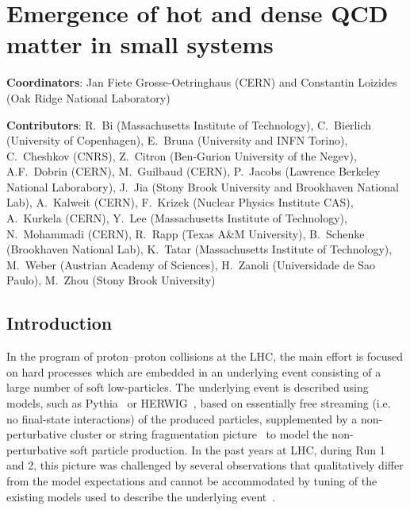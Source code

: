 \documentclass[../report.tex]{subfiles}
\begin{document}
\section{Emergence of hot and dense QCD matter in small systems}
\label{chapter:smallsystems}

{ \small
\noindent \textbf{Coordinators}: Jan Fiete Grosse-Oetringhaus (CERN) and Constantin Loizides (Oak Ridge National Laboratory)

\noindent \textbf{Contributors}:
R.~Bi (Massachusetts Institute of Technology),
C.~Bierlich (University of Copenhagen),
E.~Bruna (University and INFN Torino),
C.~Cheshkov (CNRS),
Z.~Citron (Ben-Gurion University of the Negev),
A.F.~Dobrin (CERN),
M.~Guilbaud (CERN),
P.~Jacobs (Lawrence Berkeley National Laborabory),
J.~Jia (Stony Brook University and Brookhaven National Lab),
A.~Kalweit (CERN),
F.~Krizek (Nuclear Physics Institute CAS),
A.~Kurkela (CERN),
Y.~Lee (Massachusetts Institute of Technology),
N.~Mohammadi (CERN),
R.~Rapp (Texas A\&M University),
B.~Schenke (Brookhaven National Lab),
K.~Tatar (Massachusetts Institute of Technology),
M.~Weber (Austrian Academy of Sciences),
H.~Zanoli (Universidade de Sao Paulo),
M.~Zhou (Stony Brook University)
}

\subsection{Introduction}

In the program of proton--proton collisions at the LHC, the main effort is focused on hard processes which are embedded in an underlying event consisting of a large number of soft low-\pT particles. The underlying event is described using models, such as Pythia~\cite{Sjostrand:2014zea} or HERWIG~\cite{Bellm:2015jjp}, based on essentially free streaming (i.e. no final-state interactions) of the produced particles, supplemented by a non-perturbative cluster or string fragmentation picture~\cite{Andersson:1983ia,Webber:1983if} to model the non-perturbative soft particle production.
In the past years at LHC, during Run 1 and 2, this picture was challenged by several observations that qualitatively differ from the model expectations and cannot be accommodated by tuning of the existing models used to describe the underlying event~\cite{Fischer:2016zzs}.
\end{document}

